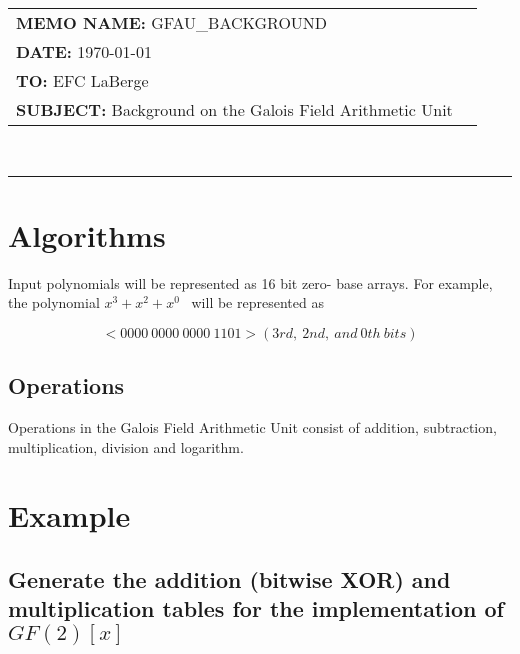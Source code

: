 \documentclass[11pt]{extarticle}
\newcommand{\examplepoly}{$x^{3}+x^{2}+x^{0}$}
\newcommand{\documentinfo}[4]{
    \begin{centering}
        \parbox{2in}{
        \begin{spacing}{1}
            \begin{flushleft}
                \begin{tabular}{l l} #1 \\ #2 \\ #3 \\ #4 \\
                \end{tabular} \\
                \rule{\textwidth}{1pt}
            \end{flushleft}
        \end{spacing} }
    \end{centering} }
\begin{document}
    \documentinfo{\textbf{MEMO NAME:} GFAU\_BACKGROUND}{\textbf{DATE:}
    \today}{\textbf{TO:} EFC LaBerge}{\textbf{SUBJECT: } Background on the
    Galois Field Arithmetic Unit}
    \vspace{-0.1in}

    

    \section{Algorithms} Input polynomials will be represented as 16 bit zero-
    base arrays. For example, the polynomial \examplepoly~ will be represented
    as

        \[ <0000 \ 0000 \ 0000 \ 1101> (3rd, \ 2nd, \ and \ 0th \ bits) \]

        

        
        \subsection{Operations} Operations in the Galois Field Arithmetic Unit
        consist of addition, subtraction, multiplication, division and
        logarithm.

            
            
            
            

    \iffalse
    \section{Example}

        \newpage
        \subsection{Generate the addition (bitwise XOR) and multiplication
        tables for the implementation of $GF(2)[x]$}
\end{document}
